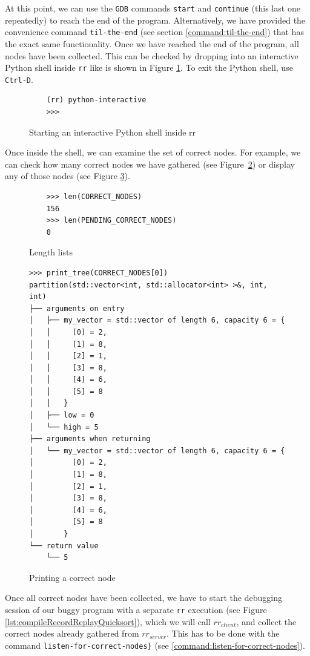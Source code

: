 At this point, we can use the \verb|GDB| commands \verb|start| and \verb|continue| (this last one repeatedly) to reach the end of the program.
Alternatively, we have provided the convenience command \verb|til-the-end| (see section \ref{command:til-the-end}) that has the exact same functionality.
Once we have reached the end of the program, all nodes have been collected. This can be checked by dropping into an interactive Python shell inside \verb|rr| like is shown in Figure \ref{fig:python-interactive}. To exit the Python shell, use \verb|Ctrl-D|.
\begin{figure}[h]
    \centering
    \caption{Starting an interactive Python shell inside rr}
    \label{fig:python-interactive}
    \begin{verbatim}
    (rr) python-interactive
    >>>
    \end{verbatim}
\end{figure}
Once inside the shell, we can examine the set of correct nodes. For example, we can check how many correct nodes we have gathered (see Figure~\ref{fig:lengthLists}) or display any of those nodes (see Figure \ref{fig:printCorrectNode}).
\begin{figure}[h]
    \centering
    \caption{Length lists}
    \label{fig:lengthLists}
    \begin{verbatim}
    >>> len(CORRECT_NODES)
    156
    >>> len(PENDING_CORRECT_NODES)
    0
    \end{verbatim}
\end{figure}

\begin{figure}[h]
    \centering
    \caption{Printing a correct node}
    \label{fig:printCorrectNode}
    \begin{verbatim}
>>> print_tree(CORRECT_NODES[0])
partition(std::vector<int, std::allocator<int> >&, int, int)
├── arguments on entry
│   ├── my_vector = std::vector of length 6, capacity 6 = {
│   │     [0] = 2,
│   │     [1] = 8,
│   │     [2] = 1,
│   │     [3] = 8,
│   │     [4] = 6,
│   │     [5] = 8
│   │   }
│   ├── low = 0
│   └── high = 5
├── arguments when returning
│   └── my_vector = std::vector of length 6, capacity 6 = {
│         [0] = 2,
│         [1] = 8,
│         [2] = 1,
│         [3] = 8,
│         [4] = 6,
│         [5] = 8
│       }
└── return value
    └── 5
    \end{verbatim}
\end{figure}
Once all correct nodes have been collected, we have to start the debugging session of our buggy program with a separate \verb|rr| execution (see Figure \ref{lst:compileRecordReplayQuicksort}), which we will call \(rr_{client}\), and collect the correct nodes already gathered from \(rr_{server}\). This has to be done with the command \verb|listen-for-correct-nodes}| (see \ref{command:listen-for-correct-nodes}).

